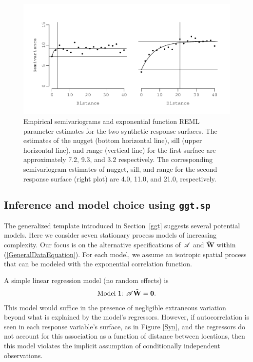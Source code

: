 \documentclass[a4paper]{article}
\newcommand{\bzero}{\textbf{0}}
\newcommand{\bW}{\textbf{W}}
\let\code=\texttt
\begin{document}
\begin{figure}[h!]
\centering
\includegraphics[width=14cm]{synVario.png}
\caption{Empirical semivariograms and exponential function REML parameter estimates for the two synthetic response surfaces.  The estimates of the nugget (bottom horizontal line), sill (upper horizontal line), and range (vertical line) for the first surface are approximately 7.2, 9.3, and 3.2 respectively.  The corresponding semivariogram estimates of nugget, sill, and range for the second response surface (right plot)  are 4.0, 11.0, and 21.0, respectively.}
\label{SynObsVario}
\end{figure}
\clearpage
\subsection[Inference and model choice using ggt.sp]{Inference and model choice using \code{ggt.sp}}\label{candidateModels}
The generalized template introduced in Section~\ref{ggt} suggests
several potential models.  Here we consider
seven stationary process models of increasing complexity.  Our focus
is on the alternative specifications of ${\cal A}$ and $\tilde{\bW}$
within (\ref{GeneralDataEquation}).  For each model, we assume an
isotropic spatial process that can be modeled with the exponential
correlation function.

A simple linear regression model (no random effects) is 
\[
\text{Model~1: } {\cal A}\tilde{\bW}=\bzero.
\]
This model would suffice in the presence of negligible
extraneous variation beyond what is explained by the model's
regressors. However, if autocorrelation is seen in each response variable's
surface, as in Figure \ref{Syn}, and the regressors do not
account for this association as a function of distance between
locations, then this model violates the implicit assumption of
conditionally independent observations.
\end{document}
